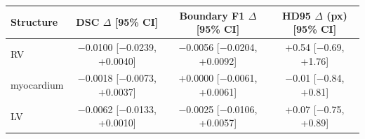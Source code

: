 \begin{tabular}{@{}lccc@{}}
\toprule
Structure & DSC $\Delta$ [95\% CI] & Boundary F1 $\Delta$ [95\% CI] & HD95 $\Delta$ (px) [95\% CI] \\
\midrule
RV & $-$0.0100 [$-$0.0239, +0.0040] & $-$0.0056 [$-$0.0204, +0.0092] & +0.54 [$-$0.69, +1.76] \\
myocardium & $-$0.0018 [$-$0.0073, +0.0037] & +0.0000 [$-$0.0061, +0.0061] & $-$0.01 [$-$0.84, +0.81] \\
LV & $-$0.0062 [$-$0.0133, +0.0010] & $-$0.0025 [$-$0.0106, +0.0057] & +0.07 [$-$0.75, +0.89] \\
\bottomrule
\end{tabular}
